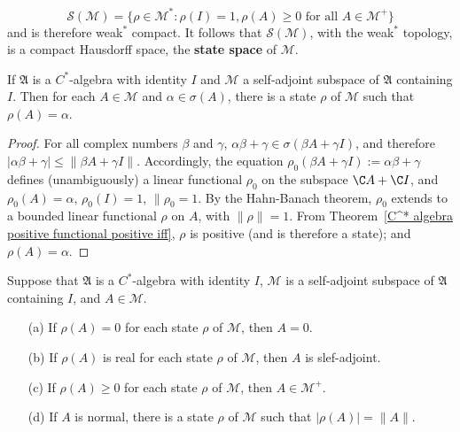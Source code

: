 \[\mathcal{S}(\mathscr{M})=\{\rho\in\mathscr{M}^*:\rho(I)=1,\rho(A)\geq 0\text{ for all $A\in\mathscr{M}^+$}\}\]
and is therefore weak$^*$ compact. It follows that $\mathcal{S}(\mathscr{M})$, with the weak$^*$ topology, is a compact Hausdorff space, the \textbf{state space} of $\mathscr{M}$.
\begin{proposition}\label{C^* algebra state fixed value}
If $\mathfrak{A}$ is a $C^*$-algebra with identity $I$ and $\mathscr{M}$ a self-adjoint subspace of $\mathfrak{A}$ containing $I$. Then for each $A\in\mathscr{M}$ and $\alpha\in\sigma(A)$, there is a state $\rho$ of $\mathscr{M}$ such that $\rho(A)=\alpha$.
\end{proposition}
\begin{proof}
For all complex numbers $\beta$ and $\gamma$, $\alpha\beta+\gamma\in\sigma(\beta A+\gamma I)$, and therefore $|\alpha\beta+\gamma|\leq\|\beta A+\gamma I\|$. Accordingly, the equation $\rho_0(\beta A+\gamma I):=\alpha\beta+\gamma$ defines (unambiguously) a linear functional $\rho_0$ on the subspace $\C A+\C I$, and $\rho_0(A)=\alpha$, $\rho_0(I)=1$, $\|\rho_0=1$. By the Hahn-Banach theorem, $\rho_0$ extends to a bounded linear functional $\rho$ on $A$, with $\|\rho\|=1$. From Theorem~\ref{C^* algebra positive functional positive iff}, $\rho$ is positive (and is therefore a state); and $\rho(A)=\alpha$.
\end{proof}
\begin{theorem}\label{C^* algebra state space prop}
Suppose that $\mathfrak{A}$ is a $C^*$-algebra with identity $I$, $\mathscr{M}$ is a self-adjoint subspace of $\mathfrak{A}$ containing $I$, and $A\in\mathscr{M}$.
\begin{itemize}
\item[(a)] If $\rho(A)=0$ for each state $\rho$ of $\mathscr{M}$, then $A=0$.
\item[(b)] If $\rho(A)$ is real for each state $\rho$ of $\mathscr{M}$, then $A$ is slef-adjoint.
\item[(c)] If $\rho(A)\geq 0$ for each state $\rho$ of $\mathscr{M}$, then $A\in\mathscr{M}^+$.
\item[(d)] If $A$ is normal, there is a state $\rho$ of $\mathscr{M}$ such that $|\rho(A)|=\|A\|$.
\end{itemize}
\end{theorem}
